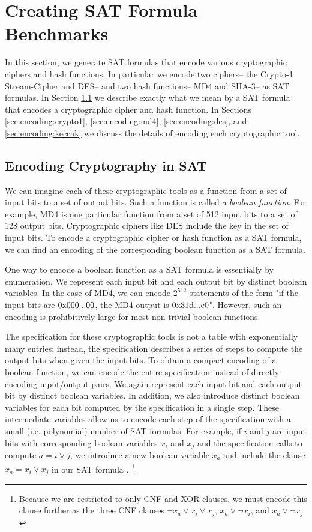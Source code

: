 \section{Creating SAT Formula Benchmarks}
\label{sec:encoding}

In this section, we generate SAT formulas that encode various cryptographic ciphers and hash functions. In particular we encode two ciphers-- the Crypto-1 Stream-Cipher and DES-- and two hash functions-- MD4 and SHA-3-- as SAT formulas. In Section \ref{sec:encoding:desc} we describe exactly what we mean by a SAT formula that encodes a cryptographic cipher and hash function. In Sections \ref{sec:encoding:crypto1}, \ref{sec:encoding:md4}, \ref{sec:encoding:des}, and \ref{sec:encoding:keccak} we discuss the details of encoding each cryptographic tool.

\subsection{Encoding Cryptography in SAT}
\label{sec:encoding:desc}
We can imagine each of these cryptographic tools as a function from a set of input bits to a set of output 
bits. Such a function is called a \emph{boolean function}. For example, MD4 is one particular function from a set of 512 input bits to a set of 128 output bits. Cryptographic ciphers like DES include the key in the set of input bits. To encode a cryptographic cipher or hash function as a SAT formula, we can find an encoding of the corresponding boolean function as a SAT formula.

One way to encode a boolean function as a SAT formula is essentially by enumeration. We represent each input bit and each output bit by distinct boolean variables. In the case of MD4, we can encode $2^{512}$ statements of the form "if the input bits are $0\text{x000...00}$, the MD4 output is $0\text{x31d...c0}$". However, such an encoding is prohibitively large for most non-trivial boolean functions.

The specification for these cryptographic tools is not a table with exponentially many entries; instead, the specification describes a series of steps to compute the output bits when given the input bits. To obtain a compact encoding of a boolean function, we can encode the entire specification instead of directly encoding input/output pairs. We again represent each input bit and each output bit by distinct boolean variables. In addition, we also introduce distinct boolean variables for each bit computed by the specification in a single step. These intermediate variables allow us to encode each step of the specification with a small (i.e. polynomial) number of SAT formulas. For example, if $i$ and $j$ are input bits with corresponding boolean variables $x_i$ and $x_j$ and the specification calls to compute $a = i \lor j$, we introduce a new boolean variable $x_a$ and include the clause $x_a = x_i \lor x_j$ in our SAT formula . \footnote{Because we are restricted to only CNF and XOR clauses, we must encode this clause further as the three CNF clauses $\neg x_a \lor x_i \lor x_j$, $x_a \lor \neg x_i$, and $x_a \lor \neg x_j$}

